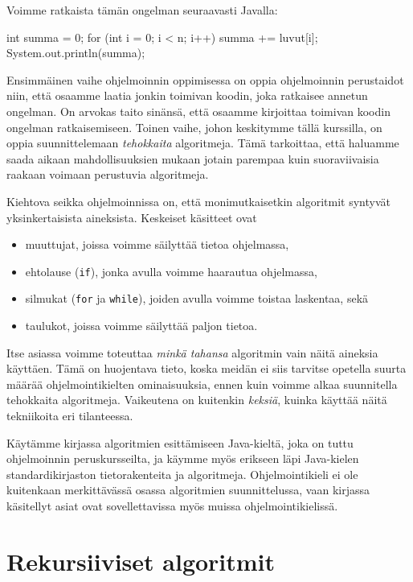 Voimme ratkaista tämän ongelman seuraavasti Javalla:

\begin{code}
int summa = 0;
for (int i = 0; i < n; i++) {
    summa += luvut[i];
}
System.out.println(summa);
\end{code}

Ensimmäinen vaihe ohjelmoinnin oppimisessa on oppia
ohjelmoinnin perustaidot niin, että osaamme laatia
jonkin toimivan koodin, joka ratkaisee annetun ongelman.
On arvokas taito sinänsä, että osaamme kirjoittaa
toimivan koodin ongelman ratkaisemiseen.
Toinen vaihe, johon keskitymme tällä kurssilla,
on oppia suunnittelemaan \emph{tehokkaita} algoritmeja.
Tämä tarkoittaa, että haluamme saada aikaan mahdollisuuksien mukaan
jotain parempaa kuin suoraviivaisia
raakaan voimaan perustuvia algoritmeja.

Kiehtova seikka ohjelmoinnissa on, että monimutkaisetkin algoritmit
syntyvät yksinkertaisista aineksista. Keskeiset käsitteet ovat

\begin{itemize}
\item muuttujat, joissa voimme säilyttää tietoa ohjelmassa,
\item ehtolause (\texttt{if}), jonka avulla voimme haarautua ohjelmassa,
\item silmukat (\texttt{for} ja \texttt{while}), joiden avulla voimme
toistaa laskentaa, sekä
\item taulukot, joissa voimme säilyttää paljon tietoa.
\end{itemize}

Itse asiassa voimme toteuttaa \emph{minkä tahansa} algoritmin
vain näitä aineksia käyttäen.
Tämä on huojentava tieto, koska meidän ei siis tarvitse opetella
suurta määrää ohjelmointikielten ominaisuuksia,
ennen kuin voimme alkaa suunnitella tehokkaita algoritmeja.
Vaikeutena on kuitenkin \emph{keksiä}, kuinka käyttää näitä
tekniikoita eri tilanteessa.

Käytämme kirjassa algoritmien esittämiseen Java-kieltä,
joka on tuttu ohjelmoinnin peruskursseilta,
ja käymme myös erikseen läpi Java-kielen
standardikirjaston tietorakenteita ja algoritmeja.
Ohjelmointikieli ei ole kuitenkaan merkittävässä osassa
algoritmien suunnittelussa, vaan kirjassa käsitellyt asiat
ovat sovellettavissa myös muissa ohjelmointikielissä.

\section{Rekursiiviset algoritmit}

